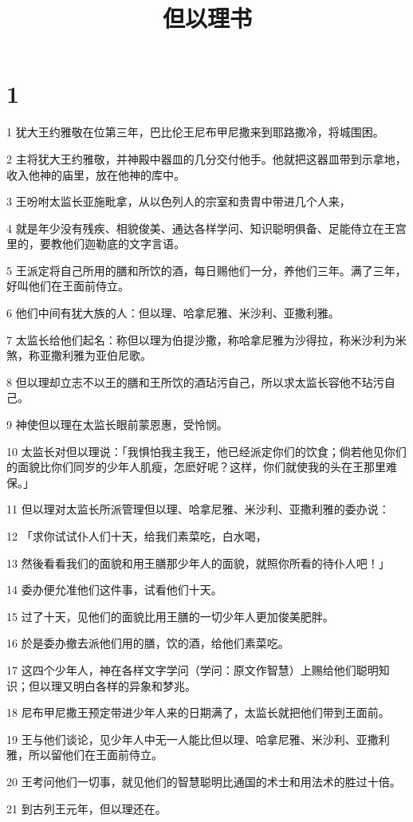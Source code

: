 

\title{但以理书}


\chapter{1}

\par 1 犹大王约雅敬在位第三年，巴比伦王尼布甲尼撒来到耶路撒冷，将城围困。
\par 2 主将犹大王约雅敬，并神殿中器皿的几分交付他手。他就把这器皿带到示拿地，收入他神的庙里，放在他神的库中。
\par 3 王吩咐太监长亚施毗拿，从以色列人的宗室和贵胄中带进几个人来，
\par 4 就是年少没有残疾、相貌俊美、通达各样学问、知识聪明俱备、足能侍立在王宫里的，要教他们迦勒底的文字言语。
\par 5 王派定将自己所用的膳和所饮的酒，每日赐他们一分，养他们三年。满了三年，好叫他们在王面前侍立。
\par 6 他们中间有犹大族的人：但以理、哈拿尼雅、米沙利、亚撒利雅。
\par 7 太监长给他们起名：称但以理为伯提沙撒，称哈拿尼雅为沙得拉，称米沙利为米煞，称亚撒利雅为亚伯尼歌。
\par 8 但以理却立志不以王的膳和王所饮的酒玷污自己，所以求太监长容他不玷污自己。
\par 9 神使但以理在太监长眼前蒙恩惠，受怜悯。
\par 10 太监长对但以理说：「我惧怕我主我王，他已经派定你们的饮食；倘若他见你们的面貌比你们同岁的少年人肌瘦，怎麽好呢？这样，你们就使我的头在王那里难保。」
\par 11 但以理对太监长所派管理但以理、哈拿尼雅、米沙利、亚撒利雅的委办说：
\par 12 「求你试试仆人们十天，给我们素菜吃，白水喝，
\par 13 然後看看我们的面貌和用王膳那少年人的面貌，就照你所看的待仆人吧！」
\par 14 委办便允准他们这件事，试看他们十天。
\par 15 过了十天，见他们的面貌比用王膳的一切少年人更加俊美肥胖。
\par 16 於是委办撤去派他们用的膳，饮的酒，给他们素菜吃。
\par 17 这四个少年人，神在各样文字学问（学问：原文作智慧）上赐给他们聪明知识；但以理又明白各样的异象和梦兆。
\par 18 尼布甲尼撒王预定带进少年人来的日期满了，太监长就把他们带到王面前。
\par 19 王与他们谈论，见少年人中无一人能比但以理、哈拿尼雅、米沙利、亚撒利雅，所以留他们在王面前侍立。
\par 20 王考问他们一切事，就见他们的智慧聪明比通国的术士和用法术的胜过十倍。
\par 21 到古列王元年，但以理还在。

